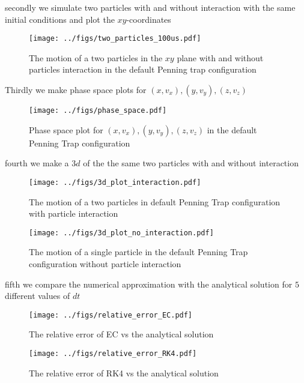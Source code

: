 \documentclass[english,notitlepage,reprint,nofootinbib]{revtex4-1}  %
\begin{document}
secondly we simulate two particles with and without interaction with the same initial conditions and plot the $xy$-coordinates

\begin{figure}[h!]
	\centering
	\texttt{[image: ../figs/two\_particles\_100us.pdf]} %
	\caption{The motion of a two particles in the $xy$ plane with and without particles interaction in the default Penning trap configuration}
	\label{fig:particles_xy}
\end{figure}

Thirdly we make phase space plots for $(x, v_x), (y, v_y), (z, v_z)$

\begin{figure}[h!]
	\centering
	\texttt{[image: ../figs/phase\_space.pdf]} %
	\caption{Phase space plot for $(x, v_x), (y, v_y), (z, v_z)$ in the default Penning Trap configuration}
	\label{fig:phase}
\end{figure}

fourth we make a $3d$ of the the same two particles with and without interaction

\begin{figure}[h!]
	\centering
	\texttt{[image: ../figs/3d\_plot\_interaction.pdf]} %
	\caption{The motion of a two particles in default Penning Trap configuration with particle interaction}
	\label{fig:3di}
\end{figure}

\begin{figure}[h!]
	\centering
	\texttt{[image: ../figs/3d\_plot\_no\_interaction.pdf]} %
	\caption{The motion of a single particle in the default Penning Trap configuration without particle interaction}
	\label{fig:3dni}
\end{figure}

fifth we compare the numerical approximation with the analytical solution for $5$ different values of $dt$

\begin{figure}[h!]
	\centering
	\texttt{[image: ../figs/relative\_error\_EC.pdf]} %
	\caption{The relative error of EC vs the analytical solution}
	\label{fig:rel_ec}
\end{figure}

\begin{figure}[h!]
	\centering
	\texttt{[image: ../figs/relative\_error\_RK4.pdf]} %
	\caption{The relative error of RK4 vs the analytical solution}
	\label{fig:rel_rk4}
\end{figure}
\end{document}
